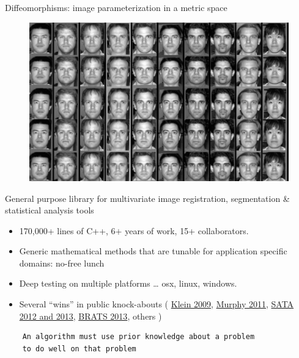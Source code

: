 \documentclass[ignorenonframetext,]{beamer}
\begin{document}
\begin{frame}{Diffeomorphisms: image parameterization in a metric space}

\begin{figure}[htbp]
\centering
\includegraphics{./figures/shape_appearance.png}
\caption{}
\end{figure}

\end{frame}

\begin{frame}[fragile]{General purpose library for multivariate image
registration, segmentation \& statistical analysis tools}

\begin{itemize}
\item
  170,000+ lines of C++, 6\(+\) years of work, 15+ collaborators.
\item
  Generic mathematical methods that are tunable for application specific
  domains: no-free lunch
\item
  Deep testing on multiple platforms \ldots{} osx, linux, windows.
\item
  Several ``wins'' in public knock-abouts (
  \href{http://www.ncbi.nlm.nih.gov/pubmed/19195496}{Klein 2009},
  \href{http://www.ncbi.nlm.nih.gov/pubmed/21632295}{Murphy 2011},
  \href{http://www.ncbi.nlm.nih.gov/pmc/articles/PMC3837555/}{SATA 2012
  and 2013},
  \href{http://martinos.org/qtim/miccai2013/proc_brats_2013.pdf}{BRATS
  2013}, others )
\end{itemize}

\begin{verbatim}
    An algorithm must use prior knowledge about a problem
    to do well on that problem
\end{verbatim}

\end{frame}
\end{document}
